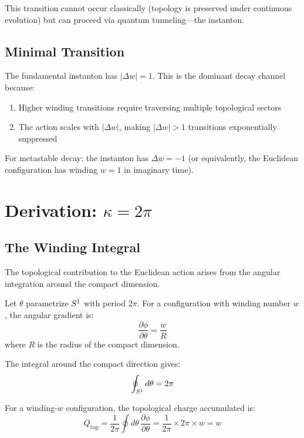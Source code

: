 This transition cannot occur classically (topology is preserved under
continuous evolution) but can proceed via quantum tunneling---the instanton.

\subsection{Minimal Transition}

The fundamental instanton has $|\Delta w| = 1$. This is the dominant decay
channel because:
\begin{enumerate}
    \item Higher winding transitions require traversing multiple topological
          sectors
    \item The action scales with $|\Delta w|$, making $|\Delta w| > 1$
          transitions exponentially suppressed
\end{enumerate}

For metastable decay: the instanton has $\Delta w = -1$ (or equivalently, the
Euclidean configuration has winding $w = 1$ in imaginary time).

\section{Derivation: $\kappa = 2\pi$}
\label{sec:kappa:result}

\subsection{The Winding Integral}

The topological contribution to the Euclidean action arises from the angular
integration around the compact dimension.

\begin{derivationbox}[title=Angular Integration]
    Let $\theta$ parametrize $S^1$ with period $2\pi$. For a configuration
    with winding number $w$, the angular gradient is:
    \begin{equation}
        \frac{\partial \phi}{\partial \theta} = \frac{w}{R}
    \end{equation}
    where $R$ is the radius of the compact dimension.

    The integral around the compact direction gives:
    \begin{equation}
        \oint_{S^1} d\theta = 2\pi
        \label{eq:angular_integral}
    \end{equation}

    For a winding-$w$ configuration, the topological charge accumulated is:
    \begin{equation}
        Q_{\text{top}} = \frac{1}{2\pi} \oint d\theta \, \frac{\partial\phi}{\partial\theta}
                       = \frac{1}{2\pi} \times 2\pi \times w = w
    \end{equation}
    \tagDer
\end{derivationbox}

